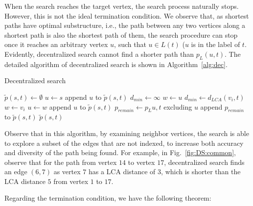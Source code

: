 When the search reaches the target vertex, the search process naturally stops. However, this is not the ideal termination condition. We observe that, as shortest paths have optimal substructure, i.e., the path between any two vertices along a shortest path is also the shortest path of them, the search procedure can stop once it reaches an arbitrary vertex $u$, such that $u \in L(t)$ ($u$ is in the label of $t$. %
Evidently, decentralized search cannot find a shorter path than $p_L(u,t)$. The detailed algorithm of decentralized search is shown in Algorithm~\ref{alg:dec}.

\begin{algorithm}
    \caption{Decentralized search}
		\label{alg:dec}
    \begin{algorithmic}
						\State $\tilde{p}(s,t) \gets \emptyset$
						\State $u \gets s$
						\State append $u$ to $\tilde{p}(s,t)$
								\State $d_{min} \gets \infty$
								\State $w \gets u$
												\State $d_{min} \gets d_{LCA}(v_i,t)$
												\State $w \gets v_i$
										\EndIf
								\EndFor
								\State $u \gets w$
								\State append $u$ to $\tilde{p}(s,t)$
						\EndWhile
						\State $p_{remain} \gets p_L{u,t}$ excluding $u$
						\State append $p_{remain}$ to $\tilde{p}(s,t)$
						\State \Return $\tilde{p}(s,t)$
        \EndFunction
    \end{algorithmic}
\end{algorithm}

Observe that in this algorithm, by examining neighbor vertices, the search is able to explore a subset of the edges that are not indexed, to increase both accuracy and diversity of the path being found. For example, in Fig.~\ref{fig:DS:common}, observe that for the path from vertex $14$ to vertex $17$, decentralized search finds an edge $(6, 7)$ as vertex $7$ has a LCA distance of $3$, which is shorter than the LCA distance $5$ from vertex $1$ to $17$.

Regarding the termination condition, we have the following theorem:

